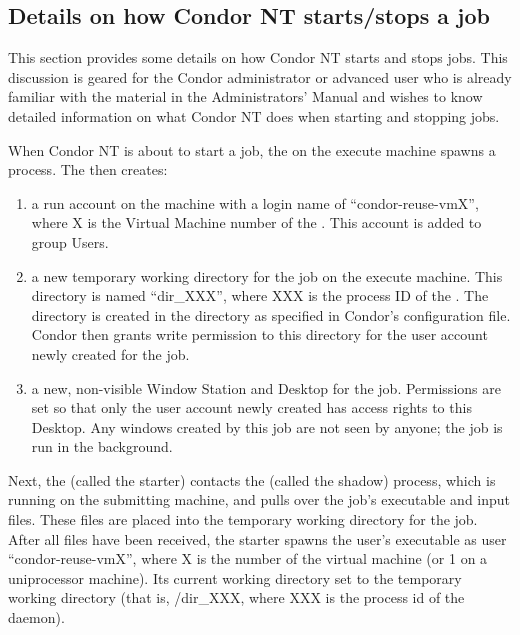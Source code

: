 \subsection{Details on how Condor NT starts/stops a job}

This section provides some details on how Condor NT starts and stops jobs.
This discussion is geared for the Condor administrator or advanced user who is
already familiar with the material in the Administrators' Manual
and wishes to know detailed information on what Condor NT does when
starting and stopping jobs.

When Condor NT is about to start a job, the  on the execute
machine spawns a  process.  The  then
creates:
\begin{enumerate}

\item a run account on the machine with a login name of
``condor-reuse-vmX'', where X is the Virtual Machine number of the
.  This account is added to group Users.

\item a new temporary working directory for the job on the execute machine.
This directory is
named ``dir\_XXX'', where XXX is the process ID of the .
The directory is created in the  directory as
specified in Condor's configuration file.  Condor then grants write
permission to this directory for the user account newly created for the
job.

\item a new, non-visible Window Station and Desktop for the job.
Permissions are set so that only the
user account newly created has access rights to this Desktop.  Any windows
created by this job are not seen by anyone; the job is run in the
background.

\end{enumerate}

Next, the  (called the starter) contacts the 
(called the shadow) process, which is
running on the submitting machine, and pulls over the job's executable and
input files.
These files are placed into the temporary working directory for the job.
After all files have been received,
the starter spawns the user's executable as user ``condor-reuse-vmX'', where X is the number of the virtual machine (or 1 on a uniprocessor machine).
Its current working directory set to the temporary working directory
(that is, /dir\_XXX, where XXX is the process id of the  daemon).

